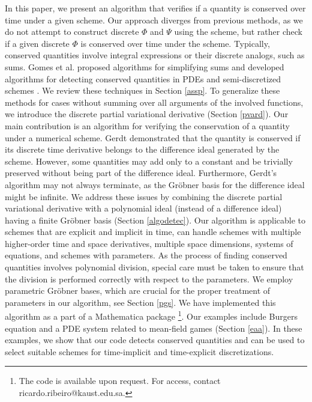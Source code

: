 \documentclass[runningheads]{llncs}
\newcommand{\1}{\chi}
\begin{document}
In this paper, we present an algorithm that verifies if a quantity is conserved over time under a given scheme. Our approach diverges from previous methods, as we do not attempt to construct discrete $\Phi$ and $\Psi$ using the scheme, but rather check if a given discrete $\Phi$ is conserved over time under the scheme. Typically, conserved quantities involve integral expressions or their discrete analogs, such as sums. Gomes et al. proposed algorithms for simplifying sums \cite{gomes20} and developed algorithms for detecting conserved quantities in PDEs and semi-discretized schemes \cite{gomes20}. We review these techniques in Section \ref{assp}.
To generalize these methods for cases without summing over all arguments of the involved functions, we introduce the discrete partial variational derivative (Section \ref{pvard}). Our main contribution is an algorithm for verifying the conservation of a quantity under a numerical scheme. Gerdt \cite{gerdt12} demonstrated that the quantity is conserved if its discrete time derivative belongs to the difference ideal generated by the scheme. However, some quantities may add only to a constant and be trivially preserved without being part of the difference ideal. Furthermore, Gerdt's algorithm may not always terminate, as the Gr{\"o}bner basis for the difference ideal might be infinite.
We address these issues by combining the discrete partial variational derivative with a polynomial ideal (instead of a difference ideal) having a finite Gr{\"o}bner basis (Section \ref{algodetec}). Our algorithm is applicable to schemes that are explicit and implicit in time, can handle schemes with multiple higher-order time and space derivatives, multiple space dimensions, systems of equations, and schemes with parameters.
As the process of finding conserved quantities involves polynomial division, special care must be taken to ensure that the division is performed correctly with respect to the parameters. We employ parametric Gr{\"o}bner  bases, which are crucial for the proper treatment of parameters in our algorithm, see Section \ref{pgs}.
 We have implemented this algorithm as a part of a {\sc Mathematica} package \cite{wolfram21}\footnote{The code is available upon request. For access, contact ricardo.ribeiro@kaust.edu.sa.}. Our examples include Burgers equation and a PDE system related to mean-field games (Section \ref{eaa}). In these examples, 
 we show that our code detects conserved quantities and can be used to select suitable schemes for time-implicit and time-explicit discretizations. 
\end{document}
